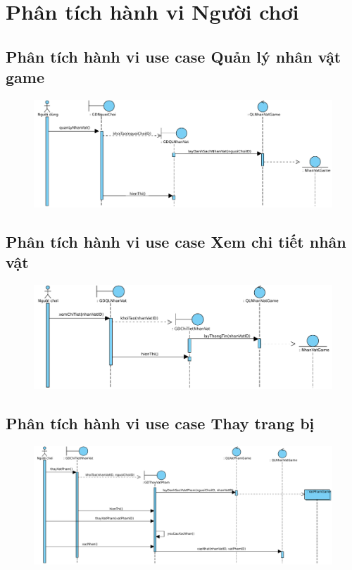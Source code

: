 \documentclass[3p]{elsarticle}
\begin{document}
\section{Phân tích hành vi Người chơi}

\subsection{Phân tích hành vi use case Quản lý nhân vật game}
\begin{figure}[!htbp]
	\hspace*{-.5in}
	\centering
	\includegraphics[scale=.55]{images/sequence-pdfs/gamer/CharacterManagement.pdf}
\end{figure}

\subsection{Phân tích hành vi use case Xem chi tiết nhân vật}
\begin{figure}[!htbp]
	\hspace*{-.5in}
	\centering
	\includegraphics[scale=.55]{images/sequence-pdfs/gamer/CharacterManagement_ViewDetail.pdf}
\end{figure}
\newpage

\subsection{Phân tích hành vi use case Thay trang bị}
\begin{figure}[!htbp]
	\hspace*{-.5in}
	\centering
	\includegraphics[scale=.5]{images/sequence-pdfs/gamer/CharacterManagement_ChangeItems.pdf}
\end{figure}
\newpage
\end{document}

